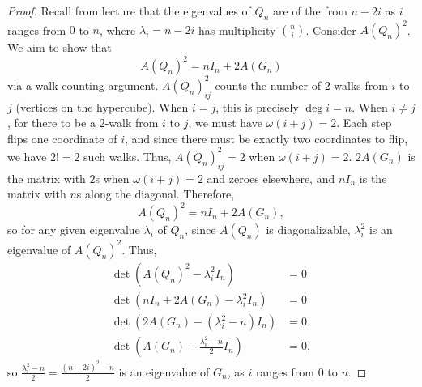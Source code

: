 \documentclass[11pt]{scrartcl}
\begin{document}
\begin{proof}
    Recall from lecture that the eigenvalues of $Q_n$ are of the from $n-2i$ as $i$ ranges from $0$ to $n$, where $\lambda_i=n-2i$ has multiplicity $\binom{n}{i}$. Consider $A(Q_n)^2$. We aim to show that \[A(Q_n)^2=nI_n+2A(G_n)\] via a walk counting argument. $A(Q_n)^2_{ij}$ counts the number of $2$-walks from $i$ to $j$ (vertices on the hypercube). When $i=j$, this is precisely $\deg i=n$. When $i\neq j$, for there to be a $2$-walk from $i$ to $j$, we must have $\omega(i+j)=2$. Each step flips one coordinate of $i$, and since there must be exactly two coordinates to flip, we have $2!=2$ such walks. Thus, $A(Q_n)^2_{ij}=2$ when $\omega(i+j)=2$. $2A(G_n)$ is the matrix with $2$s when $\omega(i+j)=2$ and zeroes elsewhere, and $nI_n$ is the matrix with $n$s along the diagonal. Therefore, \[A(Q_n)^2=nI_n+2A(G_n),\] so for any given eigenvalue $\lambda_i$ of $Q_n$, since $A(Q_n)$ is diagonalizable, $\lambda_i^2$ is an eigenvalue of $A(Q_n)^2$. Thus,
    \begin{align*}
        \det(A(Q_n)^2-\lambda_i^2I_n)&=0\\
        \det(nI_n+2A(G_n)-\lambda_i^2I_n)&=0\\
        \det(2A(G_n)-(\lambda_i^2-n)I_n)&=0\\
        \det\left(A(G_n)-\frac{\lambda_i^2-n}{2}I_n\right)&=0,
    \end{align*} 
    so $\frac{\lambda_i^2-n}{2}=\frac{(n-2i)^2-n}{2}$ is an eigenvalue of $G_n$, as $i$ ranges from $0$ to $n$.
\end{proof}
\end{document}
